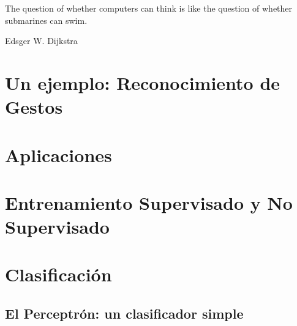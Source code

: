 \epigraph{The question of whether computers can think is like the question of whether submarines can swim. }{Edsger W. Dijkstra}







\section{Un ejemplo: Reconocimiento de Gestos}

\section{Aplicaciones}

\section{Entrenamiento Supervisado y No Supervisado}

\section{Clasificación}

\subsection{El Perceptrón: un clasificador simple}
\label{aprendizaje:perceptron}

